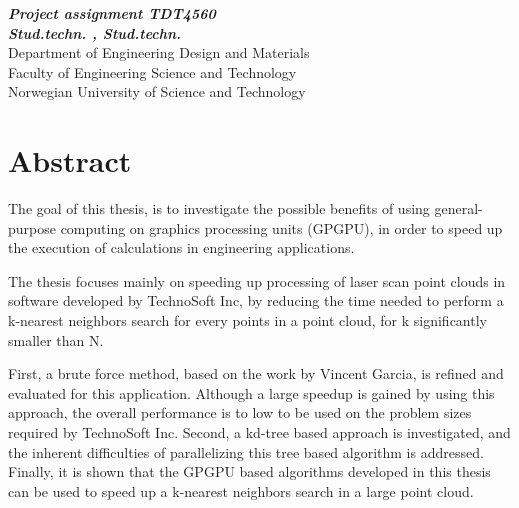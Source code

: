 \begin{center}
{\Large\bfseries \mytitle}
\end{center}

\begin{center}
{\bfseries\slshape Project assignment TDT4560}
\\[1.0cm]
{\bfseries\slshape
Stud.techn. \myauthorA, Stud.techn. \myauthorB \\}
Department of Engineering Design and Materials \\
Faculty of Engineering Science and Technology\\
Norwegian University of Science and Technology
\end{center}
\section*{Abstract}

The goal of this thesis, is to investigate the possible benefits of using general-purpose computing on graphics processing units (GPGPU), in order to speed up the execution of calculations in engineering applications.

The thesis focuses mainly on speeding up processing of laser scan point clouds in software developed by TechnoSoft Inc, by reducing the time needed to perform a k-nearest neighbors search for every points in a point cloud, for k significantly smaller than N.

First, a brute force method, based on the work by Vincent Garcia, is refined and evaluated for this application. Although a large speedup is gained by using this approach, the overall performance is to low to be used on the problem sizes required by TechnoSoft Inc. Second, a kd-tree based approach is investigated, and the inherent difficulties of parallelizing this tree based algorithm is addressed. Finally, it is shown that the GPGPU based algorithms developed in this thesis can be used to speed up a k-nearest neighbors search in a large point cloud.
